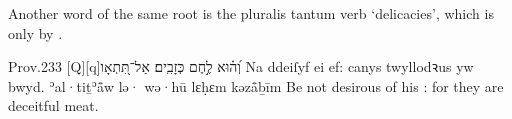 
\begin{paper}
	Another word of the same root is the pluralis tantum verb  ‘delicacies’, which is only by .
\end{paper}

\begin{example}{Prov.}{23}{3}{}{}
	\quoling
	{אַל־תִּ֭תְאָו‪[Q]‬‪[q]‬  וְ֝ה֗וּא לֶ֣חֶם כְּזָבִֽים׃}
	{Na ddeiſyf ei  ef: canys twyllodꝛus yw bwyd.}
	{ʾal·tiṯʾå̄w lə· wə·hū lɛḥɛm kəzå̄ḇīm}
	{Be not desirous of his : for they are deceitful meat.}
\end{example}
